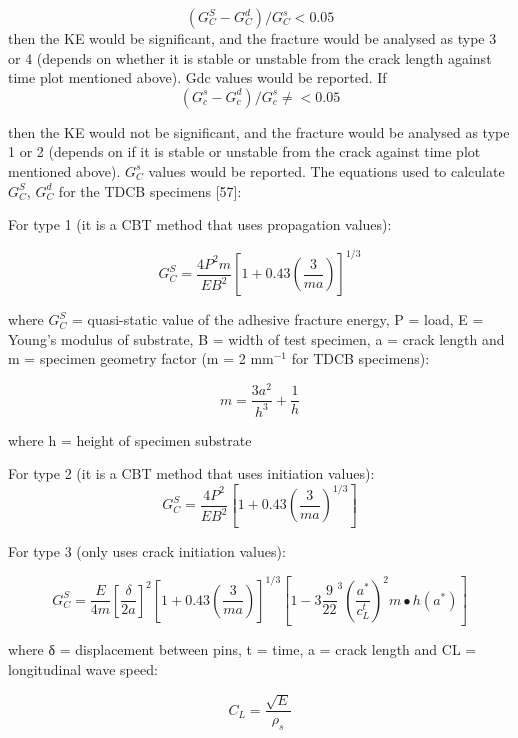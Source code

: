 \documentclass[numbers=noendperiod,chapterprefix=on]{icldt} %
\begin{document}
\begin{equation} 
(G_C^S  - G_C^d)/G_C^s< 0.05
\end{equation}
then the KE would be significant, and the fracture would be analysed as type 3 or 4 (depends on whether it is stable or unstable from the crack length against time plot mentioned above). Gdc values would be reported.
If
\begin{equation} 
(G_c^s  - G_c^d)/G_c^s\neq< 0.05
\end{equation}

then the KE would not be significant, and the fracture would be analysed as type 1 or 2 (depends on if it is stable or unstable from the crack against time plot mentioned above). $G^s_C$ values would be reported. The equations used to calculate $G^S_C$, $G^d_C$ for the TDCB specimens [57]: 

For type 1 (it is a CBT method that uses propagation values): 

\begin{equation} 
G_C^S= \frac{4P^2 m}{EB^2} \left[1+0.43\left( \frac{3}{ma}\right) \right] ^{1/3}
\end{equation}

where $G^S_C$ = quasi-static value of the adhesive fracture energy, P = load, E = Young’s modulus of substrate, B = width of test specimen, a = crack length and m = specimen geometry factor (m = 2 mm$^{-1}$ for TDCB specimens):


\begin{equation} 
m=\frac{3a^2}{h^3}+\frac{1}{h}
\end{equation}

where h = height of specimen substrate

For type 2 (it is a CBT method that uses initiation values):
\begin{equation} 
G_C^S=\frac{4P^2}{EB^2}\left[1+0.43\left(\frac{3}{ma}\right) ^{1/3} \right]
\end{equation}

For type 3 (only uses crack initiation values):

\begin{equation} 
G_C^S= \frac{E}{4m}\left[\frac{\delta}{2a}\right]^2 \left[1+0.43(\frac{3}{ma})\right]^{1/3} \left[1-3\frac{9}{22}^3 \left(\frac{a^*}{c_L^{ t}}\right) ^2 m∙h(a^*)\right]
\end{equation}

where δ = displacement between pins, t = time, a = crack length and CL = longitudinal wave speed:

\begin{equation} 
C_L= \frac{\sqrt{E}}{\rho_s}
\end{equation}
\end{document}

